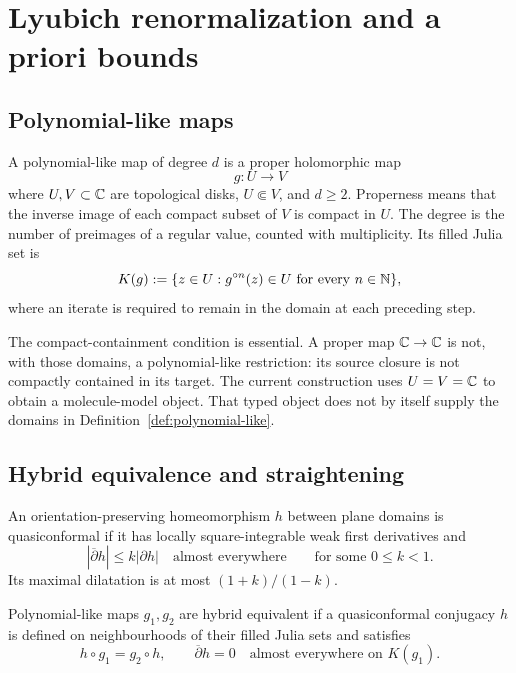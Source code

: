 \chapter{Lyubich renormalization and a priori bounds}
\label{chap:renormalization}

\section{Polynomial-like maps}

\begin{definition}
\label{def:polynomial-like}
A polynomial-like map of degree $d$ is a proper holomorphic map
\[
 g:U\longrightarrow V
\]
where $U,V\subset\mathbb C$ are topological disks, $U\Subset V$, and
$d\ge2$.  Properness means that the inverse image of each compact
subset of $V$ is compact in $U$.  The degree is the number of
preimages of a regular value, counted with multiplicity.
Its filled Julia set is
\[
 K(g):=\{z\in U:g^{\circ n}(z)\in U\text{ for every }n\in\mathbb N\},
\]
 where an iterate is required to remain in the domain at each preceding
 step.
 \end{definition}

 The compact-containment condition is essential.  A proper map
 $\mathbb C\to\mathbb C$ is not, with those domains, a polynomial-like restriction:
 its source closure is not compactly contained in its target.
 The current construction  uses
 $U=V=\mathbb C$ to obtain a molecule-model object.  That typed object does
 not by itself supply the domains in Definition~\ref{def:polynomial-like}.

 \section{Hybrid equivalence and straightening}

 \begin{definition}
 An orientation-preserving homeomorphism $h$ between plane domains is
 quasiconformal if it has locally square-integrable weak first
 derivatives and
 \[
  |\overline\partial h|\le k|\partial h|\quad\text{almost everywhere}
  \qquad\text{for some }0\le k<1.
 \]
 Its maximal dilatation is at most $(1+k)/(1-k)$.
 \end{definition}

 \begin{definition}
 Polynomial-like maps $g_1,g_2$ are hybrid equivalent if a
 quasiconformal conjugacy $h$ is defined on neighbourhoods of their
 filled Julia sets and satisfies
 \[
  h\circ g_1=g_2\circ h,\qquad
  \overline\partial h=0\quad\text{almost everywhere on }K(g_1).
 \]
 \end{definition}

